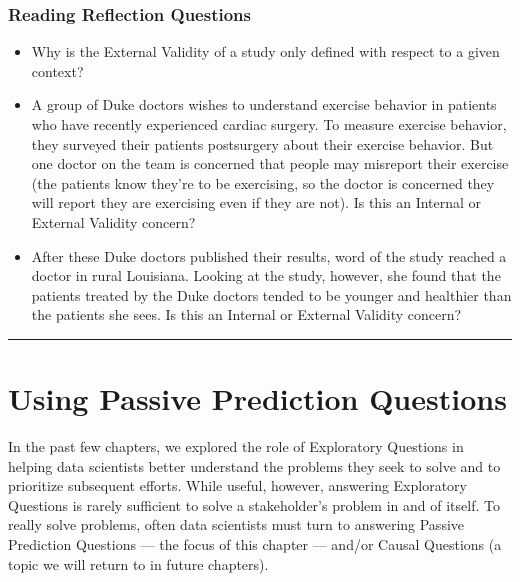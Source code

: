 \documentclass[letterpaper,10pt,english]{jupyterBook}
\begin{document}
\subsection{Reading Reflection Questions}
\label{\detokenize{30_questions/17_exploratory_questions_internal_external:reading-reflection-questions}}\begin{itemize}
\item {} 
\sphinxAtStartPar
Why is the External Validity of a study only defined with respect to a given context?

\item {} 
\sphinxAtStartPar
A group of Duke doctors wishes to understand exercise behavior in patients who have recently experienced cardiac surgery. To measure exercise behavior, they surveyed their patients post\sphinxhyphen{}surgery about their exercise behavior. But one doctor on the team is concerned that people may mis\sphinxhyphen{}report their exercise (the patients know they’re  to be exercising, so the doctor is concerned they will report they are exercising even if they are not). Is this an Internal or External Validity concern?

\item {} 
\sphinxAtStartPar
After these Duke doctors published their results, word of the study reached a doctor in rural Louisiana. Looking at the study, however, she found that the patients treated by the Duke doctors tended to be younger and healthier than the patients she sees. Is this an Internal or External Validity concern?

\end{itemize}




\bigskip\hrule\bigskip


\sphinxstepscope


\chapter{Using Passive Prediction Questions}
\label{\detokenize{30_questions/20_using_passive_prediction_questions:using-passive-prediction-questions}}\label{\detokenize{30_questions/20_using_passive_prediction_questions::doc}}
\sphinxAtStartPar
In the past few chapters, we explored the role of Exploratory Questions in helping data scientists better understand the problems they seek to solve and to prioritize subsequent efforts. While useful, however, answering Exploratory Questions is rarely sufficient to solve a stakeholder’s problem in and of itself. To really solve problems, often data scientists must turn to answering Passive Prediction Questions — the focus of this chapter — and/or Causal Questions (a topic we will return to in future chapters).
\end{document}
